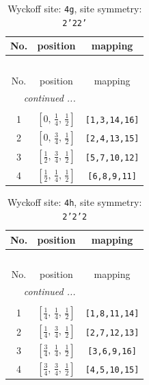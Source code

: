 \documentclass[fleqn,8pt]{jsarticle}
\begin{document}
\renewcommand{\arraystretch}{1.2}
\begin{longtable}{ccc}
\caption{Wyckoff site: {\tt 4g}, site symmetry: {\tt 2'22'}}
 \\
 \hline \hline
No. & position & mapping \\ \hline \endfirsthead

\multicolumn{2}{l}{\tablename\ \thetable{}} \\
 \hline \hline
No. & position & mapping \\ \hline \endhead

 \hline \hline
\multicolumn{2}{r}{\footnotesize\it continued ...} \\ \endfoot

 \hline \hline
\multicolumn{2}{r}{} \\ \endlastfoot

1 & $\left[ 0,\, \frac{1}{4},\, \frac{1}{2} \right]$ & {\tt [1,3,14,16]} \\ \hline
2 & $\left[ 0,\, \frac{3}{4},\, \frac{1}{2} \right]$ & {\tt [2,4,13,15]} \\ \hline
3 & $\left[ \frac{1}{2},\, \frac{3}{4},\, \frac{1}{2} \right]$ & {\tt [5,7,10,12]} \\ \hline
4 & $\left[ \frac{1}{2},\, \frac{1}{4},\, \frac{1}{2} \right]$ & {\tt [6,8,9,11]} \\
\end{longtable}
\renewcommand{\arraystretch}{1.2}
\begin{longtable}{ccc}
\caption{Wyckoff site: {\tt 4h}, site symmetry: {\tt 2'2'2}}
 \\
 \hline \hline
No. & position & mapping \\ \hline \endfirsthead

\multicolumn{2}{l}{\tablename\ \thetable{}} \\
 \hline \hline
No. & position & mapping \\ \hline \endhead

 \hline \hline
\multicolumn{2}{r}{\footnotesize\it continued ...} \\ \endfoot

 \hline \hline
\multicolumn{2}{r}{} \\ \endlastfoot

1 & $\left[ \frac{1}{4},\, \frac{1}{4},\, \frac{1}{2} \right]$ & {\tt [1,8,11,14]} \\ \hline
2 & $\left[ \frac{1}{4},\, \frac{3}{4},\, \frac{1}{2} \right]$ & {\tt [2,7,12,13]} \\ \hline
3 & $\left[ \frac{3}{4},\, \frac{1}{4},\, \frac{1}{2} \right]$ & {\tt [3,6,9,16]} \\ \hline
4 & $\left[ \frac{3}{4},\, \frac{3}{4},\, \frac{1}{2} \right]$ & {\tt [4,5,10,15]} \\
\end{longtable}
\end{document}

